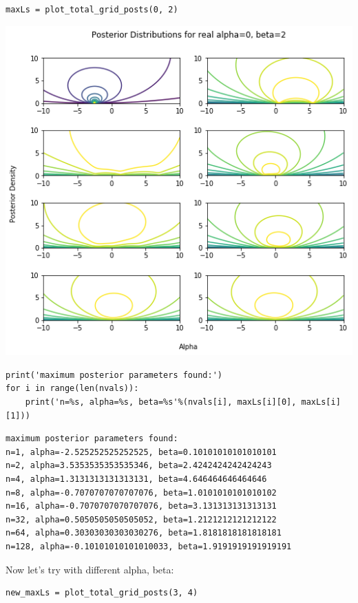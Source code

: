 \documentclass[11pt]{article}
\begin{document}
\begin{verbatim}
maxLs = plot_total_grid_posts(0, 2)
\end{verbatim}

\includegraphics[width=.9\linewidth]{./obipy-resources/322uLc.png}


\begin{verbatim}
print('maximum posterior parameters found:')
for i in range(len(nvals)):
    print('n=%s, alpha=%s, beta=%s'%(nvals[i], maxLs[i][0], maxLs[i][1]))
\end{verbatim}

\begin{verbatim}
maximum posterior parameters found:
n=1, alpha=-2.525252525252525, beta=0.10101010101010101
n=2, alpha=3.5353535353535346, beta=2.4242424242424243
n=4, alpha=1.3131313131313131, beta=4.646464646464646
n=8, alpha=-0.7070707070707076, beta=1.0101010101010102
n=16, alpha=-0.7070707070707076, beta=3.131313131313131
n=32, alpha=0.5050505050505052, beta=1.2121212121212122
n=64, alpha=0.30303030303030276, beta=1.8181818181818181
n=128, alpha=-0.10101010101010033, beta=1.9191919191919191
\end{verbatim}

Now let's try with different alpha, beta:

\begin{verbatim}
new_maxLs = plot_total_grid_posts(3, 4)
\end{verbatim}
\end{document}
